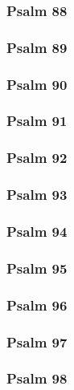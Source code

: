 \documentclass[10pt]{extarticle}
\begin{document}
\begin{multicols}{2}
\subsubsection{Psalm 88}

\newpage

\subsubsection{Psalm 89}

\newpage

\subsubsection{Psalm 90}

\newpage

\subsubsection{Psalm 91}

\newpage

\subsubsection{Psalm 92}

\newpage

\subsubsection{Psalm 93}

\newpage

\subsubsection{Psalm 94}

\newpage

\subsubsection{Psalm 95}

\newpage

\subsubsection{Psalm 96}

\newpage

\subsubsection{Psalm 97}

\newpage

\subsubsection{Psalm 98}

\newpage


\end{multicols}
\end{document}
